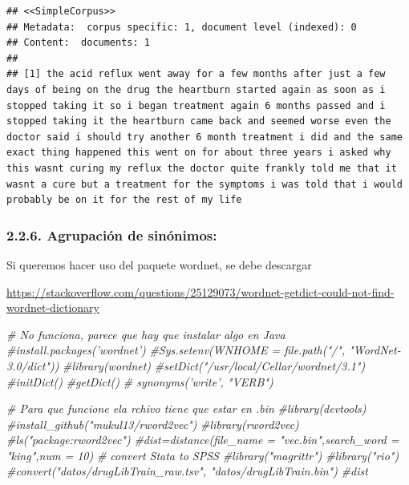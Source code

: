 \documentclass[spanish,]{article}
\newenvironment{Shaded}{\begin{snugshade}}{\end{snugshade}}
\newcommand{\CommentTok}[1]{\textcolor[rgb]{0.56,0.35,0.01}{\textit{#1}}}
\begin{document}
\begin{verbatim}
## <<SimpleCorpus>>
## Metadata:  corpus specific: 1, document level (indexed): 0
## Content:  documents: 1
## 
## [1] the acid reflux went away for a few months after just a few days of being on the drug the heartburn started again as soon as i stopped taking it so i began treatment again 6 months passed and i stopped taking it the heartburn came back and seemed worse even the doctor said i should try another 6 month treatment i did and the same exact thing happened this went on for about three years i asked why this wasnt curing my reflux the doctor quite frankly told me that it wasnt a cure but a treatment for the symptoms i was told that i would probably be on it for the rest of my life
\end{verbatim}

\hypertarget{agrupacion-de-sinonimos}{%
\subsubsection{2.2.6. Agrupación de
sinónimos:}\label{agrupacion-de-sinonimos}}

Si queremos hacer uso del paquete wordnet, se debe descargar

\url{https://stackoverflow.com/questions/25129073/wordnet-getdict-could-not-find-wordnet-dictionary}

\begin{Shaded}
\begin{Highlighting}[]
\CommentTok{# No funciona, parece que hay que instalar algo en Java}
\CommentTok{#install.packages('wordnet')}
\CommentTok{#Sys.setenv(WNHOME = file.path("/", "WordNet-3.0/dict"))}
\CommentTok{#library(wordnet)}
\CommentTok{#setDict("/usr/local/Cellar/wordnet/3.1")}
\CommentTok{#initDict()}
\CommentTok{#getDict()}
\CommentTok{# synonyms(’write’, "VERB")}
\end{Highlighting}
\end{Shaded}

\begin{Shaded}
\begin{Highlighting}[]
\CommentTok{# Para que funcione ela rchivo tiene que estar en .bin}
\CommentTok{#library(devtools)}
\CommentTok{#install_github("mukul13/rword2vec")}
\CommentTok{#library(rword2vec)}
\CommentTok{#ls("package:rword2vec")}
\CommentTok{#dist=distance(file_name = "vec.bin",search_word = "king",num = 10)}
\CommentTok{# convert Stata to SPSS}
\CommentTok{#library("magrittr")}
\CommentTok{#library("rio")}
\CommentTok{#convert("datos/drugLibTrain_raw.tsv", "datos/drugLibTrain.bin")}
\CommentTok{#dist}
\end{Highlighting}
\end{Shaded}
\end{document}
